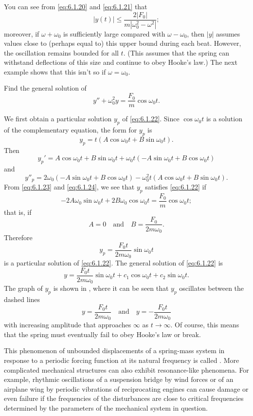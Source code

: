 You can see from
\eqref{eq:6.1.20} and \eqref{eq:6.1.21} that
\[
|y(t)|\le\frac{2|F_0|}{m|\omega_0^2-\omega^2|};
\]
moreover, if $\omega+\omega_0$ is sufficiently large compared with $\omega
-\omega_0$, then $|y|$ assumes values close to (perhaps equal to) this
upper bound during each beat. However, the oscillation remains bounded for
all $t$. (This assumes that the spring can withstand
deflections of this size and continue to obey Hooke's law.)  The next
example shows that this isn't  so if $\omega=\omega_0$.

\begin{example}\label{example:6.1.5}
Find the general solution of
\begin{equation}\label{eq:6.1.22}
y''+\omega_0^2y=\frac{F_0}{m}\cos\omega_0t.
\end{equation}
\end{example}


\begin{solution}
We first obtain a particular solution $y_p$ of \eqref{eq:6.1.22}. Since
$\cos\omega_0t$ is a solution of the complementary equation, the form
for $y_p$ is
\begin{equation}\label{eq:6.1.23}
y_p=t(A\cos\omega_0t+B\sin\omega_0t).
\end{equation}
 Then
\[
y_p'=A\cos\omega_0t+B\sin\omega_0t
+\omega_0t(-A\sin\omega_0t+B\cos\omega_0t)
\]
and
\begin{equation}\label{eq:6.1.24}
y''_p=2\omega_0(-A\sin\omega_0t
+B\cos\omega_0t)-\omega_0^2t(A\cos\omega_0t+B\sin\omega_0t).
\end{equation}
From \eqref{eq:6.1.23} and \eqref{eq:6.1.24}, we see that $y_p$ satisfies
\eqref{eq:6.1.22} if
\[
-2A\omega_0\sin\omega_0t+2B\omega_0\cos\omega_0t=\frac{F_0}{m}
\cos\omega_0t;
\]
that is, if
\[
A=0\quad\text{and}\quad  B=\frac{F_0}{2m\omega_0}.
\]
Therefore
\[
y_p=\frac{F_0t}{2m\omega_0}\sin\omega_0t
\]
is a particular solution of \eqref{eq:6.1.22}. The general solution of
 \eqref{eq:6.1.22} is
\[
y=\frac{F_0t}{2m\omega_0}\sin\omega_0t+c_1\cos\omega_0t+c_2\sin\omega_0t.
\]
The graph of $y_p$ is shown in ,  where it can be
seen that $y_p$ oscillates between the dashed lines
\[
y=\frac{F_0t}{2m\omega_0}\quad\text{and}\quad  y=-\frac{F_0t}{2m\omega_0}
\]
with increasing amplitude that approaches $\infty$ as $t\to\infty$. Of
course, this means that the spring must eventually fail to obey Hooke's law
or break.
\end{solution}


This phenomenon of unbounded displacements of a spring-mass system in
response to a periodic forcing function at its natural
frequency is called . More complicated mechanical
structures can also exhibit resonance-like phenomena. For example,
rhythmic oscillations of a suspension bridge by wind forces or of an
airplane wing by periodic vibrations of reciprocating engines can
cause damage or even failure if the frequencies of the disturbances
are close to critical frequencies determined by the parameters of the
mechanical system in question.



